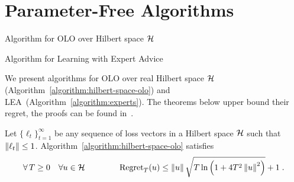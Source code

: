 \section{Parameter-Free Algorithms}


\begin{algorithm}[t]
\caption{Algorithm for OLO over Hilbert space $\mathcal{H}$
\label{algorithm:hilbert-space-olo}}
\begin{algorithmic}[1]
{
\ENDFOR
}
\end{algorithmic}
\end{algorithm}
\begin{algorithm}[t]
\begin{algorithmic}[1]
\caption{Algorithm for Learning with Expert Advice \label{algorithm:experts}}
{
\ENDFOR
}
\end{algorithmic}
\end{algorithm}

We present algorithms for \ac{OLO} over real Hilbert space $\mathcal{H}$
(Algorithm~\ref{algorithm:hilbert-space-olo}) and
\ac{LEA}~(Algorithm~\ref{algorithm:experts}).  The theorems below upper bound
their regret, the proofs can be found in~\cite{Orabona-Pal-2016-parameter-free}.

\begin{theorem}
\label{theorem:hilbert-space-olo-regret}
Let $\{\ell_t\}_{t=1}^\infty$ be any sequence of loss vectors
in a Hilbert space $\mathcal{H}$ such that $\left\|{\ell_t}\right\| \le 1$.
Algorithm~\ref{algorithm:hilbert-space-olo} satisfies
$$
\forall \, T \ge 0 \quad
\forall u \in \mathcal{H} \qquad \qquad
\operatorname{Regret}_T(u) \le \left\|{u}\right\| \sqrt{T \ln\left(1 + 4T^2 \left\|{u}\right\|^2 \right)} + 1 \;.
$$
\end{theorem}

